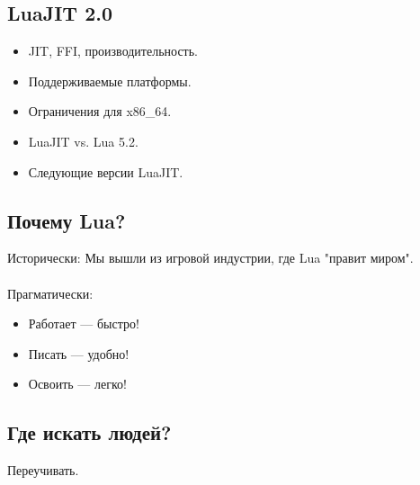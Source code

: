 \documentclass[aspectratio=169,handout,bigger]{beamer}
\begin{document}

\subsection*{LuaJIT 2.0}

\begin{frame}
  \begin{itemize}
    \item JIT, FFI, производительность.
    \item Поддерживаемые платформы.
    \item Ограничения для x86\_64.
    \item LuaJIT vs. Lua 5.2.
    \item Следующие версии LuaJIT.
  \end{itemize}
\end{frame}


\subsection*{Почему Lua?}

\begin{frame}
  Исторически: Мы вышли из игровой индустрии, где Lua "правит миром".
  \\~\\
  Прагматически:
  \begin{itemize}
    \item Работает — быстро!
    \item Писать — удобно!
    \item Освоить — легко!
  \end{itemize}
\end{frame}


\subsection*{Где искать людей?}

\begin{frame}
  \begin{center}
    Переучивать.
  \end{center}
\end{frame}
\end{document}

